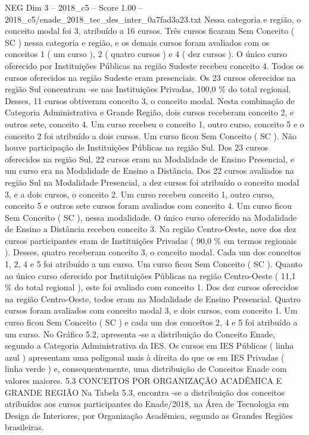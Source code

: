 \begin{textsample}{NEG Dim 3 – 2018\_c5 – Score 1.00 – 2018\_c5/enade\_2018\_tec\_des\_inter\_0a7fad3a23.txt}
Nessa categoria e região, o conceito modal foi 3, atribuído a 16 cursos.
Três cursos ficaram Sem Conceito ( SC ) nessa categoria e região, e os demais cursos foram avaliados com os conceitos 1 ( um curso ), 2 ( quatro cursos ) e 4 ( dez cursos ).
O único curso oferecido por Instituições Públicas na região Sudeste recebeu conceito 4.
Todos os cursos oferecidos na região Sudeste eram presenciais.
Os 23 cursos oferecidos na região Sul concentram -se nas Instituições Privadas, 100,0 \% do total regional.
Desses, 11 cursos obtiveram conceito 3, o conceito modal.
Nesta combinação de Categoria Administrativa e Grande Região, dois cursos receberam conceito 2, e outros sete, conceito 4.
Um curso recebeu o conceito 1, outro curso, conceito 5 e o conceito 2 foi atribuído a dois cursos.
Um curso ficou Sem Conceito ( SC ).
Não houve participação de Instituições Públicas na região Sul.
Dos 23 cursos oferecidos na região Sul, 22 cursos eram na Modalidade de Ensino Presencial, e um curso era na Modalidade de Ensino a Distância.
Dos 22 cursos avaliados na região Sul na Modalidade Presencial, a dez cursos foi atribuído o conceito modal 3, e a dois cursos, o conceito 2.
Um curso recebeu conceito 1, outro curso, conceito 5 e outros sete cursos foram avaliados com conceito 4.
Um curso ficou Sem Conceito ( SC ), nessa modalidade.
O único curso oferecido na Modalidade de Ensino a Distância recebeu conceito 3.
Na região Centro-Oeste, nove dos dez cursos participantes eram de Instituições Privadas ( 90,0 \% em termos regionais ).
Desses, quatro receberam conceito 3, o conceito modal.
Cada um dos conceitos 1, 2, 4 e 5 foi atribuído a um curso.
Um curso ficou Sem Conceito ( SC ).
Quanto ao único curso oferecido por Instituições Públicas na região Centro-Oeste ( 11,1 \% do total regional ), este foi avaliado com conceito 1.
Dos dez cursos oferecidos na região Centro-Oeste, todos eram na Modalidade de Ensino Presencial.
Quatro cursos foram avaliados com conceito modal 3, e dois cursos, com conceito 1.
Um curso ficou Sem Conceito ( SC ) e cada um dos conceitos 2, 4 e 5 foi atribuído a um curso.
No Gráfico 5.2, apresenta -se a distribuição do Conceito Enade, segundo a Categoria Administrativa da IES.
Os cursos em IES Públicas ( linha azul ) apresentam uma poligonal mais à direita do que os em IES Privadas ( linha verde ) e, consequentemente, uma distribuição de Conceitos Enade com valores maiores. 5.3 CONCEITOS POR ORGANIZAÇÃO ACADÊMICA E GRANDE REGIÃO Na Tabela 5.3, encontra -se a distribuição dos conceitos atribuídos aos cursos participantes do Enade/2018, na Área de Tecnologia em Design de Interiores, por Organização Acadêmica, segundo as Grandes Regiões brasileiras.

\end{textsample}
